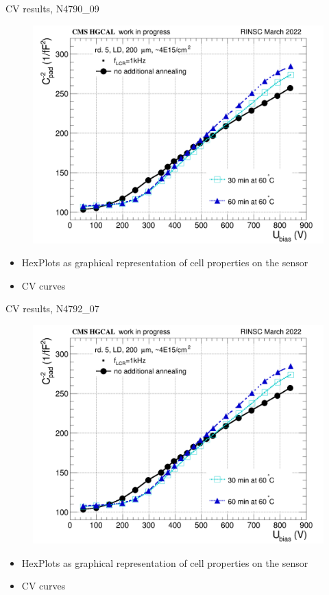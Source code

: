 \documentclass{beamer}
\begin{document}
\begin{frame}{CV results, N4790\_09}
  \begin{figure}
      \includegraphics[width=1.0\textwidth]{plots/annealing_CV_ch101_N4790_09.png}    
  \end{figure}
  \begin{itemize}
    \item HexPlots as graphical representation of cell properties on the sensor
    \item CV curves
  \end{itemize}
\end{frame}

\begin{frame}{CV results, N4792\_07}
  \begin{figure}
      \includegraphics[width=1.0\textwidth]{plots/annealing_CV_ch101_N4792_7.png}    
  \end{figure}
  \begin{itemize}
    \item HexPlots as graphical representation of cell properties on the sensor
    \item CV curves
  \end{itemize}
\end{frame}
\end{document}
